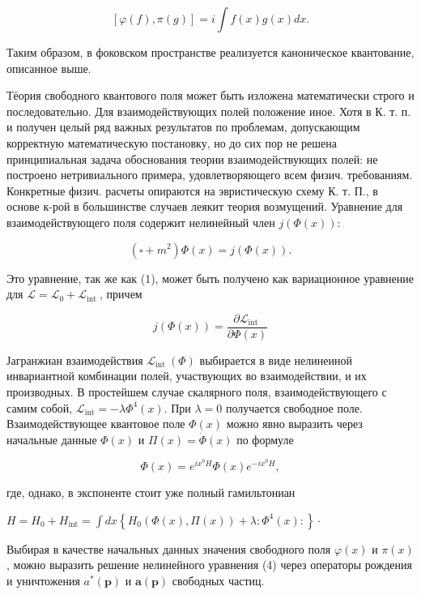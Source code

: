 \documentclass[10pt]{article}
\begin{document}
\[

[\varphi(f), \pi(g)]=i \int f(x) g(x) d x .

\]



Таким образом, в фоковском пространстве реализуется каноническое квантование, описанное выше.



Тёория свободного квантового поля может быть изложена математически строго и последовательно. Для взаимодействующих полей положение иное. Хотя в К. т. п. и получен целый ряд важных результатов по проблемам, допускающим корректную математическую постановку, но до сих пор не решена принципиальная задача обоснования теории взаимодействующих полей: не построено нетривиального примера, удовлетворяющего всем физич. требованиям. Конкретные физич. расчеты опираются на эвристическую схему К. т. П., в основе к-рой в большинстве случаев леякит теория возмущений. Уравнение для взаимодействующего поля содержит нелинейный член $j(\Phi(x)):$



\[

\left(\square+m^{2}\right) \Phi(x)=j(\Phi(x)) .

\]



Это уравнение, так же как (1), может быть получено как вариационное уравнение для $\mathscr{L}=\mathscr{L}_{0}+\mathscr{L}_{\text {int }}$, причем



\[

j(\Phi(x))=\frac{\partial \mathscr{L}_{\text {int }}}{\partial \Phi(x)}

\]



Јагранжиан взаимодействия $\mathscr{L}_{\text {int }}(\Phi)$ выбирается в виде нелинеиной инвариантной комбинации полей, участвующих во взаимодействии, и их производных. В простейшем случае скалярного поля, взаимодействующего с самим собой, $\mathscr{L}_{\mathrm{int}}=-\lambda \Phi^{4}(x)$. При $\lambda=0$ получается свободное поле. Взаимодействующее квантовое поле $\Phi(x)$ можно явно выразить через начальные данные $\Phi(x)$ и $\Pi(x)=\dot{\Phi}(x)$ по формуле



\[

\Phi(x)=e^{i x^{0} H} \Phi(x) e^{-i x^{0} H},

\]



где, однако, в экспоненте стоит уже полный гамильтониан



$H=H_{0}+H_{\mathrm{int}}=\int d x\left\{H_{0}(\Phi(x), \Pi(x))+\lambda: \Phi^{4}(x):\right\} \cdot$



Выбирая в качестве начальных данных значения свободного поля $\varphi(x)$ и $\pi(x)$, можно выразить решение нелинейного уравнения (4) через операторы рождения и уничтожения $a^{*}(\boldsymbol{p})$ и $\boldsymbol{a}(\boldsymbol{p})$ свободных частиц.
\end{document}
